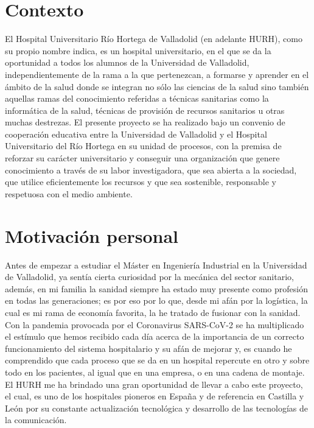 \section{Contexto}

El Hospital Universitario Río Hortega de Valladolid (en adelante HURH), como su propio nombre indica, es un hospital universitario, en el que se da la oportunidad a todos los alumnos de la Universidad de Valladolid, independientemente de la rama a la que pertenezcan, a formarse y aprender en el ámbito de la salud donde se integran no sólo las ciencias de la salud sino también aquellas ramas del conocimiento referidas a técnicas sanitarias como la informática de la salud, técnicas de provisión de recursos sanitarios u otras muchas destrezas. El presente proyecto se ha realizado bajo un convenio de cooperación educativa entre la Universidad de Valladolid y el Hospital Universitario del Río Hortega en su unidad de procesos, con la premisa de reforzar su carácter universitario y conseguir una organización que genere conocimiento a través de su labor investigadora, que sea abierta a la sociedad, que utilice eficientemente los recursos y que sea sostenible, responsable y respetuosa con el medio ambiente.

\section{Motivación personal}

Antes de empezar a estudiar el Máster en Ingeniería Industrial en la Universidad de Valladolid, ya sentía cierta curiosidad por la mecánica del sector sanitario, además, en mi familia la sanidad siempre ha estado muy presente como profesión en todas las generaciones; es por eso por lo que, desde mi afán por la logística, la cual es mi rama de economía favorita, la he tratado de fusionar con la sanidad. Con la pandemia provocada por el Coronavirus SARS-CoV-2 se ha multiplicado el estímulo que hemos recibido cada día acerca de la importancia de un correcto funcionamiento del sistema hospitalario y su afán de mejorar y, es cuando he comprendido que cada proceso que se da en un hospital repercute en otro y sobre todo en los pacientes, al igual que en una empresa, o en una cadena de montaje. El HURH me ha brindado una gran oportunidad de llevar a cabo este proyecto, el cual, es uno de los hospitales pioneros en España y de referencia en Castilla y León por su constante actualización tecnológica y desarrollo de las tecnologías de la
comunicación.

